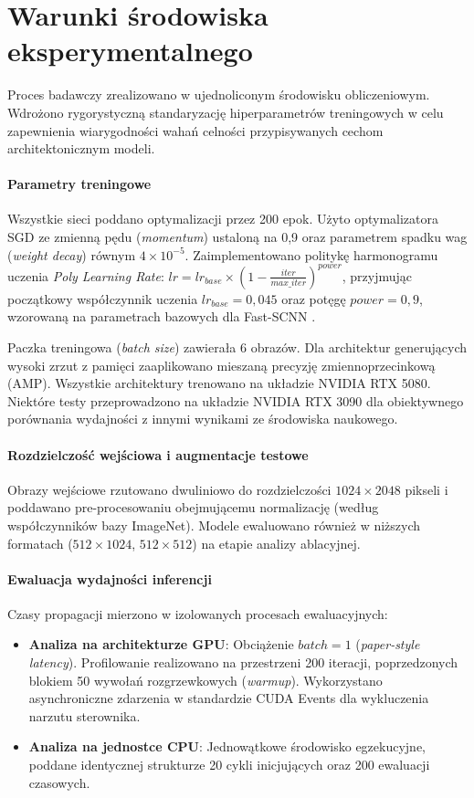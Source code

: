 \section{Warunki środowiska eksperymentalnego}
Proces badawczy zrealizowano w ujednoliconym środowisku obliczeniowym. Wdrożono rygorystyczną standaryzację hiperparametrów treningowych w celu zapewnienia wiarygodności wahań celności przypisywanych cechom architektonicznym modeli.

\paragraph{Parametry treningowe}
Wszystkie sieci poddano optymalizacji przez 200 epok. Użyto optymalizatora SGD ze zmienną pędu (\textit{momentum}) ustaloną na 0,9 oraz parametrem spadku wag (\textit{weight decay}) równym $4 \times 10^{-5}$. Zaimplementowano politykę harmonogramu uczenia \textit{Poly Learning Rate}: $lr = lr_{base} \times (1 - \frac{iter}{max\_iter})^{power}$, przyjmując początkowy współczynnik uczenia $lr_{base} = 0,045$ oraz potęgę $power = 0,9$, wzorowaną na parametrach bazowych dla Fast-SCNN . 

Paczka treningowa (\textit{batch size}) zawierała 6 obrazów. Dla architektur generujących wysoki zrzut z pamięci zaaplikowano mieszaną precyzję zmiennoprzecinkową (AMP). Wszystkie architektury trenowano na układzie NVIDIA RTX 5080. Niektóre testy przeprowadzono na układzie NVIDIA RTX 3090 dla obiektywnego porównania wydajności z innymi wynikami ze środowiska naukowego.

\paragraph{Rozdzielczość wejściowa i augmentacje testowe}
Obrazy wejściowe rzutowano dwuliniowo do rozdzielczości $1024 \times 2048$ pikseli i poddawano pre-procesowaniu obejmującemu normalizację (według współczynników bazy ImageNet). Modele ewaluowano również w niższych formatach ($512 \times 1024$, $512 \times 512$) na etapie analizy ablacyjnej.

\paragraph{Ewaluacja wydajności inferencji}
Czasy propagacji mierzono w izolowanych procesach ewaluacyjnych:
\begin{itemize}
    \item \textbf{Analiza na architekturze GPU}: Obciążenie $batch=1$ (\textit{paper-style latency}). Profilowanie realizowano na przestrzeni 200 iteracji, poprzedzonych blokiem 50 wywołań rozgrzewkowych (\textit{warmup}). Wykorzystano asynchroniczne zdarzenia w standardzie CUDA Events dla wykluczenia narzutu sterownika.
    \item \textbf{Analiza na jednostce CPU}: Jednowątkowe środowisko egzekucyjne, poddane identycznej strukturze 20 cykli inicjujących oraz 200 ewaluacji czasowych.
\end{itemize}


